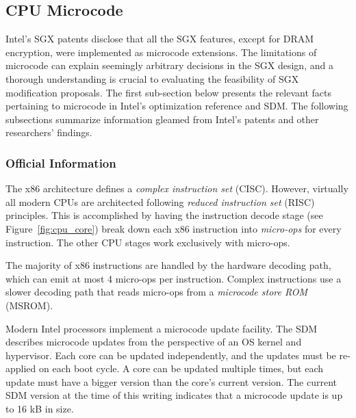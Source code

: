 \subsection{CPU Microcode}
\label{sec:microcode}

Intel's SGX patents disclose that all the SGX features, except for DRAM
encryption, were implemented as microcode extensions. The limitations of
microcode can explain seemingly arbitrary decisions in the SGX design, and a
thorough understanding is crucial to evaluating the feasibility of SGX
modification proposals. The first sub-section below presents the relevant facts
pertaining to microcode in Intel's optimization reference
\cite{intel2014optimization} and SDM. The following subsections summarize
information gleamed from Intel's patents and other researchers' findings.


\subsubsection{Official Information}
\label{sec:microcode_official}


The x86 architecture defines a \textit{complex instruction set} (CISC).
However, virtually all modern CPUs are architected following \textit{reduced
instruction set} (RISC) principles. This is accomplished by having the
instruction decode stage (see Figure~\ref{fig:cpu_core}) break down each x86
instruction into \textit{micro-ops} for every instruction. The other CPU stages
work exclusively with micro-ops.


The majority of x86 instructions are handled by the hardware decoding path,
which can emit at most 4 micro-ops per instruction. Complex instructions use a
slower decoding path that reads micro-ops from a \textit{microcode store ROM}
(MSROM).


Modern Intel processors implement a microcode update facility. The SDM
describes microcode updates from the perspective of an OS kernel and
hypervisor. Each core can be updated independently, and the updates must be
re-applied on each boot cycle. A core can be updated multiple times, but each
update must have a bigger version than the core's current version. The current
SDM version at the time of this writing indicates that a microcode update is
up to 16 kB in size.

